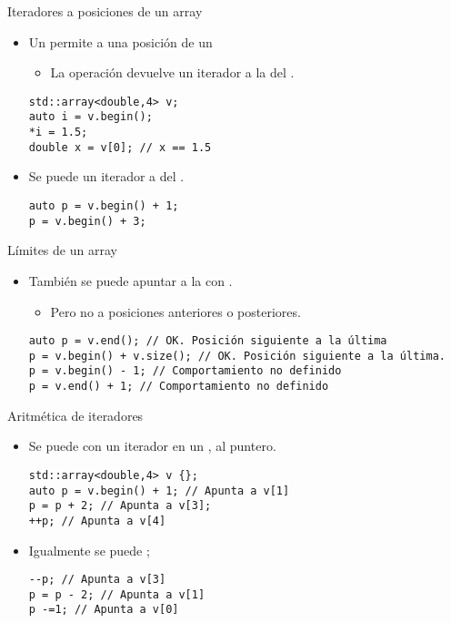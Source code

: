 \begin{frame}[t,fragile]{Iteradores a posiciones de un array}
\begin{itemize}
  \item Un  permite  
        a una posición de un 
    \begin{itemize}
      \item La operación  devuelve un iterador a la 
             del .
    \end{itemize}
\begin{lstlisting}
std::array<double,4> v;
auto i = v.begin();
*i = 1.5;
double x = v[0]; // x == 1.5
\end{lstlisting}

  \item Se puede  un iterador a  del 
        .
\begin{lstlisting}
auto p = v.begin() + 1;
p = v.begin() + 3;
\end{lstlisting}
\end{itemize}
\end{frame}

\begin{frame}[t,fragile]{Límites de un array}
\begin{itemize}
  \item También se puede apuntar a la 
        con .
    \begin{itemize}
      \item Pero no a posiciones anteriores o posteriores.
    \end{itemize}
\begin{lstlisting}
auto p = v.end(); // OK. Posición siguiente a la última
p = v.begin() + v.size(); // OK. Posición siguiente a la última.
p = v.begin() - 1; // Comportamiento no definido
p = v.end() + 1; // Comportamiento no definido
\end{lstlisting}
\end{itemize}
\end{frame}

\begin{frame}[t,fragile]{Aritmética de iteradores}
\begin{itemize}
  \item Se puede  con un iterador en un , 
         al puntero.
\begin{lstlisting}
std::array<double,4> v {};
auto p = v.begin() + 1; // Apunta a v[1]
p = p + 2; // Apunta a v[3];
++p; // Apunta a v[4]
\end{lstlisting}

  \item Igualmente se puede ;
\begin{lstlisting}
--p; // Apunta a v[3]
p = p - 2; // Apunta a v[1]
p -=1; // Apunta a v[0]
\end{lstlisting}
\end{itemize}
\end{frame}

